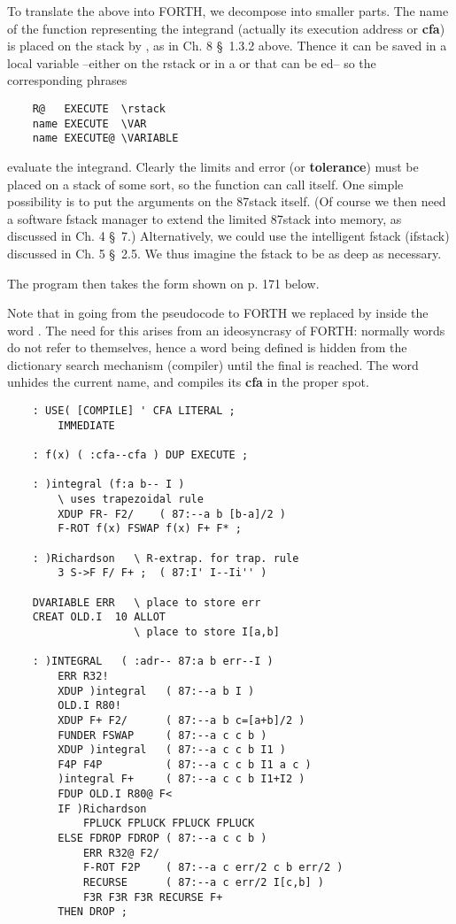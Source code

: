 To translate the above into FORTH, we decompose into smaller parts. The name of the function representing the integrand (actually its execution address or \textbf{cfa}) is placed on the stack by , as in Ch. 8 \S\ 1.3.2 above. Thence it can be saved in a local variable --either on the rstack or in a  or  that can be ed-- so the corresponding phrases

\begin{lstlisting}
    R@   EXECUTE  \rstack
    name EXECUTE  \VAR
    name EXECUTE@ \VARIABLE
\end{lstlisting}

evaluate the integrand. Clearly the limits and error (or \textbf{tolerance}) must be placed on a stack of some sort, so the function can call itself. One simple possibility is to put the arguments on the 87stack itself. (Of course we then need a software fstack manager to extend the limited 87stack into memory, as discussed in Ch. 4 \S\ 7.) Alternatively, we could use the intelligent fstack (ifstack) discussed in Ch. 5 \S\ 2.5. We thus imagine the fstack to be as deep as necessary.

The program then takes the form shown on p. 171 below.

Note that in going from the pseudocode to FORTH we replaced  by  inside the word . The need for this arises from an ideosyncrasy of FORTH: normally words do not refer to themselves, hence a word being deﬁned is hidden from the dictionary search mechanism (compiler) until the ﬁnal \bc{;} is reached. The word  unhides the current name, and compiles its \textbf{cfa} in the proper spot.

\begin{lstlisting}
    : USE( [COMPILE] ' CFA LITERAL ;
        IMMEDIATE
    
    : f(x) ( :cfa--cfa ) DUP EXECUTE ;
    
    : )integral (f:a b-- I )
        \ uses trapezoidal rule
        XDUP FR- F2/    ( 87:--a b [b-a]/2 )
        F-ROT f(x) FSWAP f(x) F+ F* ;
    
    : )Richardson   \ R-extrap. for trap. rule
        3 S->F F/ F+ ;  ( 87:I' I--Ii'' )

    DVARIABLE ERR   \ place to store err
    CREAT OLD.I  10 ALLOT
                    \ place to store I[a,b]

    : )INTEGRAL   ( :adr-- 87:a b err--I )
        ERR R32!
        XDUP )integral   ( 87:--a b I )
        OLD.I R80!
        XDUP F+ F2/      ( 87:--a b c=[a+b]/2 )
        FUNDER FSWAP     ( 87:--a c c b )
        XDUP )integral   ( 87:--a c c b I1 )
        F4P F4P          ( 87:--a c c b I1 a c )
        )integral F+     ( 87:--a c c b I1+I2 )
        FDUP OLD.I R80@ F<
        IF )Richardson
            FPLUCK FPLUCK FPLUCK FPLUCK
        ELSE FDROP FDROP ( 87:--a c c b )
            ERR R32@ F2/
            F-ROT F2P    ( 87:--a c err/2 c b err/2 )
            RECURSE      ( 87:--a c err/2 I[c,b] )
            F3R F3R F3R RECURSE F+
        THEN DROP ;
\end{lstlisting}

